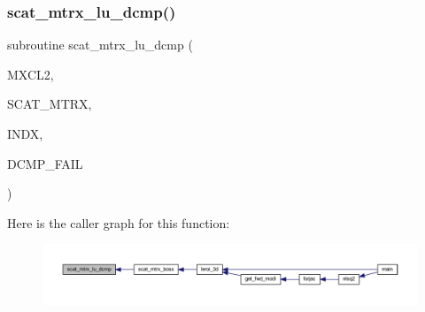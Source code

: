\subsubsection{\texorpdfstring{scat\+\_\+mtrx\+\_\+lu\+\_\+dcmp()}{scat\_mtrx\_lu\_dcmp()}}
{\footnotesize\ttfamily subroutine scat\+\_\+mtrx\+\_\+lu\+\_\+dcmp (\begin{DoxyParamCaption}\item[{integer, intent(in)}]{M\+X\+C\+L2,  }\item[{complex, dimension(mxcl2,mxcl2), intent(inout)}]{S\+C\+A\+T\+\_\+\+M\+T\+RX,  }\item[{integer, dimension(mxcl2), intent(out)}]{I\+N\+DX,  }\item[{logical}]{D\+C\+M\+P\+\_\+\+F\+A\+IL }\end{DoxyParamCaption})}

Here is the caller graph for this function\+:\nopagebreak
\begin{figure}[H]
\begin{center}
\leavevmode
\includegraphics[width=350pt]{Leroi_8f90_aeb059f2d64018397965c145c4af183ff_icgraph}
\end{center}
\end{figure}
\mbox{\label{Leroi_8f90_a34542cb94b24b37bf99b63f2e3e5e368}} 
